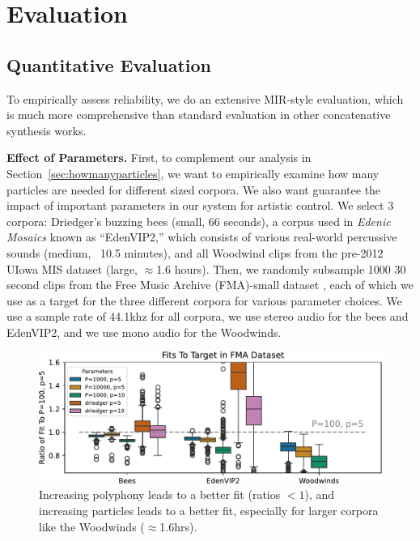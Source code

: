 \documentclass{article}
\begin{document}
\section{Evaluation}
\label{sec:evaluation}

\subsection{Quantitative Evaluation}
\label{sec:quantitativeevaluation}

To empirically assess reliability, we do an extensive MIR-style evaluation, which is much more comprehensive than standard evaluation in other concatenative synthesis works.

\textbf{Effect of Parameters.} First, to complement our analysis in Section~\ref{sec:howmanyparticles}, we want to empirically examine how many particles are needed for different sized corpora.  We also want guarantee the impact of important parameters in our system for artistic control.  We select 3 corpora: Driedger's buzzing bees (small, 66 seconds), a corpus used in {\em Edenic Mosaics}\cite{cantil2021} known as ``EdenVIP2,'' which consists of various real-world percussive sounds (medium, ~10.5 minutes), and all Woodwind clips from the pre-2012 UIowa MIS dataset \cite{uiowadataset} (large, $\approx$1.6 hours).  Then, we randomly subsample 1000 30 second clips from the Free Music Archive (FMA)-small dataset \cite{fma_dataset}, each of which we use as a target for the three different corpora for various parameter choices.  We use a sample rate of 44.1khz for all corpora, we use stereo audio for the bees and EdenVIP2, and we use mono audio for the Woodwinds.

\begin{figure}
    \centering
    \includegraphics[width=\columnwidth]{figs/FMAFit.pdf}
    \caption{Increasing polyphony leads to a better fit (ratios $<1$), and increasing particles leads to a better fit, especially for larger corpora like the Woodwinds ($\approx$1.6hrs).}
    \label{fig:fmafit}
\end{figure}
\end{document}
